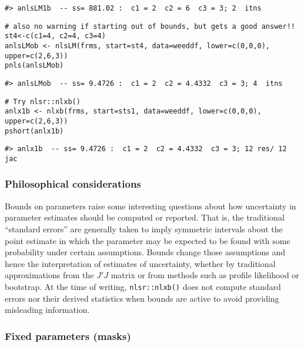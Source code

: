 \begin{verbatim}
#> anlsLM1b  -- ss= 881.02 :  c1 = 2  c2 = 6  c3 = 3; 2  itns
\end{verbatim}

\begin{verbatim}
# also no warning if starting out of bounds, but gets a good answer!!
st4<-c(c1=4, c2=4, c3=4)
anlsLMob <- nlsLM(frms, start=st4, data=weeddf, lower=c(0,0,0), upper=c(2,6,3))
pnls(anlsLMob)
\end{verbatim}

\begin{verbatim}
#> anlsLMob  -- ss= 9.4726 :  c1 = 2  c2 = 4.4332  c3 = 3; 4  itns
\end{verbatim}

\begin{verbatim}
# Try nlsr::nlxb()
anlx1b <- nlxb(frms, start=sts1, data=weeddf, lower=c(0,0,0), upper=c(2,6,3))
pshort(anlx1b)
\end{verbatim}

\begin{verbatim}
#> anlx1b  -- ss= 9.4726 :  c1 = 2  c2 = 4.4332  c3 = 3; 12 res/ 12 jac
\end{verbatim}

\hypertarget{philosophical-considerations}{%
\subsubsection{Philosophical considerations}\label{philosophical-considerations}}

Bounds on parameters raise some interesting questions about how
uncertainty in parameter estimates should be computed or reported. That is, the
traditional ``standard errors'' are generally taken to imply symmetric intervals about
the point estimate in which the parameter may be expected to be found with some
probability under certain assumptions.
Bounds change those assumptions and hence the interpretation of estimates of
uncertainty, whether by traditional approximations from the \(J' J\) matrix or from methods
such as profile likelihood or bootstrap. At the time of writing,
\texttt{nlsr::nlxb()} does not compute standard errors nor their derived statistics
when bounds are active to avoid providing misleading information.

\hypertarget{fixed-parameters-masks}{%
\subsubsection{Fixed parameters (masks)}\label{fixed-parameters-masks}}


